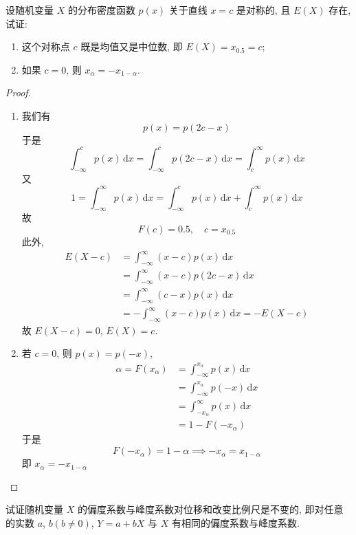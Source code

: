 \documentclass[../main.tex]{subfiles}
\begin{document}
\begin{exercise}{}{} 
设随机变量 $X$ 的分布密度函数 $p(x)$ 关于直线 $x=c$ 是对称的, 且 $E(X)$ 存在, 试证:

\begin{enumerate}
\item 这个对称点 $c$ 既是均值又是中位数, 即 $E(X) = x_{0.5} = c$;

\item 如果 $c=0$, 则 $x_{\alpha} = -x_{1-\alpha}$.
\end{enumerate}
\end{exercise}
\begin{proof}
  \begin{enumerate}
    \item   我们有 \[
    p\left( x \right)= p\left( 2c-x \right)  
    \]于是 \[
    \int_{-\infty}^{c}p\left( x \right)\,\mathrm{d} x=  \int_{-\infty}^{c}p\left( 2c-x \right)\,\mathrm{d} x= \int_{c}^{\infty}p\left( x \right)\,\mathrm{d} x   
    \]又 \[
    1= \int_{-\infty}^{\infty}p\left( x \right)\,\mathrm{d} x= \int_{-\infty}^{c}p\left( x \right)\,\mathrm{d} x+ \int_{c}^{\infty}p\left( x \right)\,\mathrm{d} x   
    \]故 \[
    F\left( c \right)= 0.5 , \quad c= x_{0.5}
    \] 此外,  \[
  \begin{aligned}
    E\left( X-c \right)&=  \int_{ -\infty}^{\infty}\left( x-c \right)p\left( x \right)\,\mathrm{d} x\\ 
     &=  \int_{-\infty}^{\infty}\left( x-c \right)p\left( 2c-x \right)\,\mathrm{d} x\\ 
      &=  \int_{-\infty}^{\infty}\left( c-x \right)p\left( x \right)\,\mathrm{d} x        \\ 
       &= -\int_{-\infty}^{\infty}\left( x-c \right)p\left( x \right)\,\mathrm{d} x= -E\left( X-c \right)   
  \end{aligned}
    \]故 \(  E\left( X-c \right)= 0   \), \(  E\left( X \right)= c   \).
    \item 若 \(  c= 0  \), 则 \(  p\left( x \right)= p\left( -x \right)    \),  \[
    \begin{aligned}
 \alpha = F\left( x_{\alpha } \right)&=  \int_{-\infty}^{x_{\alpha }}p\left( x \right)\,\mathrm{d} x \\ 
     &= \int_{-\infty}^{x_{\alpha }}p\left( -x \right)\,\mathrm{d} x\\ 
      &=   \int_{-x_{\alpha }}^{\infty}p\left( x \right)\,\mathrm{d} x\\ 
       &= 1- F\left( -x_{\alpha } \right)     
    \end{aligned}  
    \]于是 \[
 F\left(    -x_{\alpha } \right) = 1-\alpha \implies -x_{\alpha }= x_{1-\alpha }
    \]即 \(  x_{\alpha }= -x_{1-\alpha }  \) 
  \end{enumerate}
    
\end{proof} 
\begin{exercise}{}{}
试证随机变量 $X$ 的偏度系数与峰度系数对位移和改变比例尺是不变的, 即对任意的实数 $a$, $b(b \neq 0)$, $Y=a+bX$ 与 $X$ 有相同的偏度系数与峰度系数.
\end{exercise}
\end{document}
